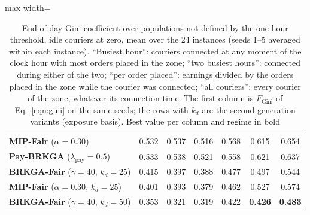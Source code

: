 \documentclass[a4paper,11pt,review,3p,authoryear]{elsarticle}
\newcommand{\FG}{F_{\text{Gini}}}
\begin{document}
\begin{table}[htbp]
\begin{adjustbox}{max width=\textwidth}
\begin{tabular}{l|c|cc|c|cc}
\textbf{MIP-Fair} ($\alpha = 0.30$) & 0.532 & 0.537 & 0.516 & 0.568 & 0.615 & 0.654 \\
\textbf{Pay-BRKGA} ($\lambda_{\text{pay}} = 0.5$) & 0.533 & 0.538 & 0.521 & 0.558 & 0.621 & 0.637 \\
\textbf{BRKGA-Fair} ($\gamma = 40$, $k_d = 25$) & 0.415 & 0.397 & 0.388 & 0.477 & 0.497 & 0.544 \\
\textbf{MIP-Fair} ($\alpha = 0.30$, $k_d = 25$) & 0.401 & 0.393 & 0.379 & 0.462 & 0.527 & 0.574 \\
\textbf{BRKGA-Fair} ($\gamma = 40$, $k_d = 50$) & 0.353 & 0.321 & 0.319 & 0.422 & \textbf{0.426} & \textbf{0.483} \\
\hline
\end{tabular}
\end{adjustbox}
\caption{End-of-day Gini coefficient over populations not defined by the one-hour threshold, idle couriers at zero, mean over the 24 instances (seeds 1--5 averaged within each instance). ``Busiest hour'': couriers connected at any moment of the clock hour with most orders placed in the zone; ``two busiest hours'': connected during either of the two; ``per order placed'': earnings divided by the orders placed in the zone while the courier was connected; ``all couriers'': every courier of the zone, whatever its connection time. The first column is $\FG$ of Eq.~\eqref{eqn:gini} on the same seeds; the rows with $k_d$ are the second-generation variants (exposure basis). Best value per column and regime in bold}
\label{tab:alt_population}
\end{table}



\end{document}
